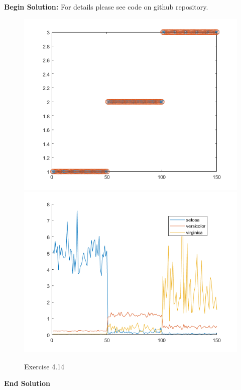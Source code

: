 \documentclass[twoside]{article}
\begin{document}
\textbf{Begin Solution:} 
For details please see code on github repository.
\begin{figure}[H]
\begin{center}
\includegraphics[width=\textwidth]{./Exercise4_14/class.png}
\includegraphics[width=\textwidth]{./Exercise4_14/prob.png}
\end{center}
\caption{Exercise 4.14}
\end{figure}

\textbf{End Solution} 

  
  
\end{document}
